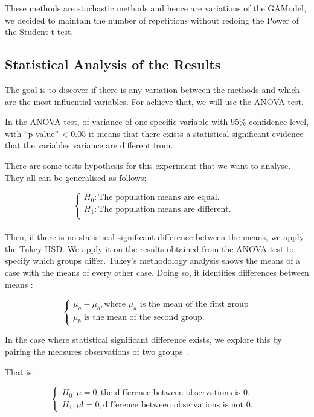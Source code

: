 These methods are stochastic methods and hence are variations of the GAModel, we decided to maintain the number of repetitions without redoing the Power of the Student t-test.

\subsection{Statistical Analysis of the Results}\label{anova}

The goal is to discover if there is any variation between the methods and which are the most influential variables. For achieve that, we will use the ANOVA test.

In the ANOVA test, of variance of one specific variable with 95\% confidence level, with ``p-value'' < 0.05 it means that there exists a statistical significant evidence that the variables variance are different from.

There are some tests hypothesis for this experiment that we want to analyse. They all can be generalised as follows:

$$\begin{cases} H_0: \text{The population means are equal.} &\\
H_1: \text{The population means are different.}&\\
\end{cases}$$\\

Then, if there is no statistical significant difference between the means, we apply the Tukey HSD. We apply it on the results obtained from the ANOVA test to specify which groups differ. Tukey's methodology analysis shows the means of a case with the means of every other case. Doing so, it identifies differences between means :

$$\begin{cases}
\mu_a-\mu_b, \text{where $\mu_a$ is the mean of the first group}\\
                \text{$\mu_b$ is the mean of the second group.}
\end{cases}$$

In the case where statistical significant difference exists, we explore this by pairing the measures observations of two groups~\cite{Campelo2015-01}.

That is:

$$\begin{cases}
H_0: \mu = 0, \text{the difference between observations is 0.}&\\
H_1: \mu != 0, \text{difference between observations is not 0.}
\end{cases}$$\\

